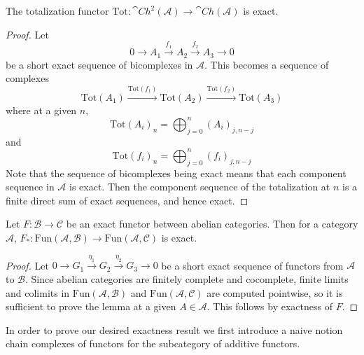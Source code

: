 \begin{lem}[label=lem:TotExact]
    The totalization functor $\text{Tot}:\cat{Ch}^2(\mathcal{A})\rightarrow \cat{Ch}(\mathcal{A})$ is exact.
\end{lem}
\begin{proof}
    Let 
    \begin{equation*}
        0\rightarrow A_1\xrightarrow{f_1} A_2\xrightarrow{f_2} A_3\rightarrow 0
    \end{equation*}
    be a short exact sequence of bicomplexes in $\mathcal{A}$. This becomes a sequence of complexes 
    \begin{equation*}
        \text{Tot}(A_1)\xrightarrow{\text{Tot}(f_1)}\text{Tot}(A_2)\xrightarrow{\text{Tot}(f_2)}\text{Tot}(A_3)
    \end{equation*}
    where at a given $n$,
    \begin{equation*}
        \text{Tot}(A_i)_n = \bigoplus_{j=0}^n(A_i)_{j,n-j}
    \end{equation*}
    and
    \begin{equation*}
        \text{Tot}(f_i)_n = \bigoplus_{j=0}^n (f_i)_{j,n-j}
    \end{equation*}
    Note that the sequence of bicomplexes being exact means that each component sequence in $\mathcal{A}$ is exact. Then the component sequence of the totalization at $n$ is a finite direct sum of exact sequences, and hence exact.
\end{proof}

\begin{lem}[label=pushForward]
    Let $F:\mathcal{B}\rightarrow \mathcal{C}$ be an exact functor between abelian categories. Then for a category $\mathcal{A}$, $F_*:\text{Fun}(\mathcal{A},\mathcal{B})\rightarrow \text{Fun}(\mathcal{A},\mathcal{C})$ is exact.
\end{lem}
\begin{proof}
    Let $0\rightarrow G_1\xrightarrow{\eta_1} G_2\xrightarrow{\eta_2} G_3\rightarrow 0$ be a short exact sequence of functors from $\mathcal{A}$ to $\mathcal{B}$. Since abelian categories are finitely complete and cocomplete, finite limits and colimits in $\text{Fun}(\mathcal{A},\mathcal{B})$ and $\text{Fun}(\mathcal{A},\mathcal{C})$ are computed pointwise, so it is sufficient to prove the lemma at a given $A \in \mathcal{A}$. This follows by exactness of $F$.
\end{proof}

In order to prove our desired exactness result we first introduce a naive notion chain complexes of functors for the subcategory of additive functors.

